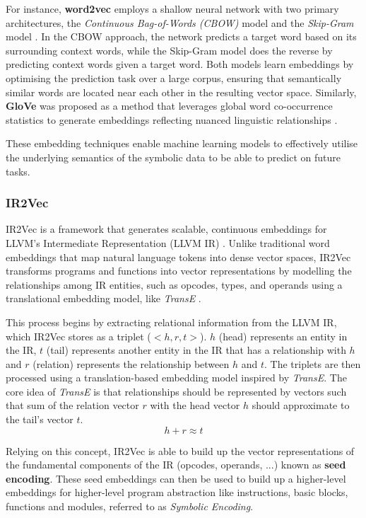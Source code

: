 For instance, \textbf{word2vec} employs a shallow neural network with two primary architectures, the \textit{Continuous Bag-of-Words (CBOW)} model and the \textit{Skip-Gram} model \cite{Word2Vec}. In the CBOW approach, the network predicts a target word based on its surrounding context words, while the Skip-Gram model does the reverse by predicting context words given a target word. Both models learn embeddings by optimising the prediction task over a large corpus, ensuring that semantically similar words are located near each other in the resulting vector space. Similarly,  \textbf{GloVe}  was proposed as a method that leverages global word co-occurrence statistics to generate embeddings reflecting nuanced linguistic relationships \cite{GloVe}.

These embedding techniques enable machine learning models to effectively utilise the underlying semantics of the symbolic data to be able to predict on future tasks.

\subsubsection{IR2Vec} \label{subsubsec:IR2Vec}
IR2Vec is a framework that generates scalable, continuous embeddings for LLVM's Intermediate Representation (LLVM IR) \cite{IR2Vec}. Unlike traditional word embeddings that map natural language tokens into dense vector spaces, IR2Vec transforms programs and functions into vector representations by modelling the relationships among IR entities, such as opcodes, types, and operands using a translational embedding model, like \textit{TransE} \cite{TranslationalEncoding}.

This process begins by extracting relational information from the LLVM IR, which IR2Vec stores as a triplet ($<h, r, t>$). $h$ (head) represents an entity in the IR, $t$ (tail) represents another entity in the IR that has a relationship with $h$ and $r$ (relation) represents the relationship between $h$ and $t$. The triplets are then processed using a translation-based embedding model inspired by \textit{TransE}. The core idea of \textit{TransE} is that relationships should be represented by vectors such that sum of the relation vector $r$ with the head vector $h$ should approximate to the tail's vector $t$.
$$h+r\approx t$$

Relying on this concept, IR2Vec is able to build up the vector representations of the fundamental components of the IR (opcodes, operands, ...) known as \textbf{seed encoding}. These seed embeddings can then be used to build up a higher-level embeddings for higher-level program abstraction like instructions, basic blocks, functions and modules, referred to as \textit{Symbolic Encoding}.

